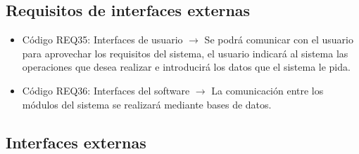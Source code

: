 \subsection{Requisitos de interfaces externas}

\begin{itemize}
    \item Código REQ35: Interfaces de usuario $\rightarrow$ Se podrá comunicar con el usuario para aprovechar los requisitos del sistema, el usuario indicará al sistema las operaciones que desea realizar e introducirá los datos que el sistema le pida.
    \item Código REQ36: Interfaces del software $\rightarrow$ La comunicación entre los módulos del sistema se realizará mediante bases de datos.
\end{itemize}

\subsection{Interfaces externas}

